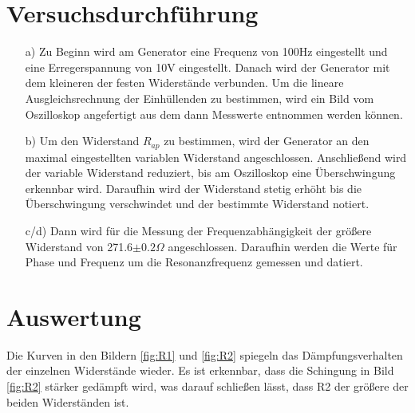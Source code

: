 
\section{Versuchsdurchführung}\justifying

 \begin{enumerate}

    \item[a)] \justifying Zu Beginn wird am Generator eine Frequenz von 100Hz 
    eingestellt und eine Erregerspannung von 10V eingestellt. Danach wird der 
    Generator mit dem kleineren der festen Widerstände verbunden.
    Um die lineare Ausgleichsrechnung der Einhüllenden zu bestimmen, wird
    ein Bild vom Oszilloskop angefertigt aus dem dann Messwerte entnommen werden
    können.

    \item[b)] \justifying Um den Widerstand $R_{ap}$ zu bestimmen, wird der Generator 
    an den maximal eingestellten variablen Widerstand angeschlossen. Anschließend wird 
    der variable Widerstand reduziert, bis am Oszilloskop eine Überschwingung erkennbar 
    wird. Daraufhin wird der Widerstand stetig erhöht bis die Überschwingung verschwindet 
    und der bestimmte Widerstand notiert.
  
    \item[c/d)] \justifying Dann wird für die Messung der Frequenzabhängigkeit
                          der größere Widerstand von 271.6$\pm0.2\Omega$ angeschlossen.
                          Daraufhin werden die Werte für Phase und Frequenz um die 
                          Resonanzfrequenz gemessen und datiert.
 \end{enumerate}


\section{Auswertung}\justifying


  Die Kurven in den Bildern \ref{fig:R1} und \ref{fig:R2} spiegeln das Dämpfungsverhalten der einzelnen Widerstände wieder. 
  Es ist erkennbar, dass die Schingung in Bild \ref{fig:R2} stärker gedämpft wird, was darauf schließen lässt, dass R2 der 
  größere der beiden Widerständen ist.

